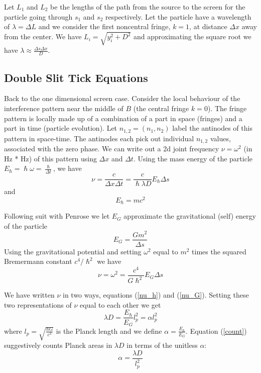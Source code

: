 \documentclass[12pt,a4paper]{article}
\begin{document}
Let $L_1$ and $L_2$ be the lengths of the path from the source to the screen for the particle going through $s_1$ and $s_2$ respectively. Let the particle have a wavelength of $\lambda = \Delta L$ and we consider the first noncentral fringe, $k=1$, at distance $\Delta x$ away from the center.  We have $L_i = \sqrt{y_i^2 + D^2}$ and approximating the square root we have $\lambda \approx \frac{\Delta s \Delta x}{D}$.

\subsection{Double Slit Tick Equations}
Back to the one dimensional screen case.  Consider the local behaviour of the interference pattern near the middle of $B$ (the central fringe $k=0$). The fringe pattern is locally made up of a combination of a part in space (fringes) and a part in time (particle evolution). Let $n_{1,2} = (n_1, n_2)$ label the antinodes of this pattern in space-time. The antinodes each pick out individual $n_{1,2}$ values, associated with the zero phase. We can write out a 2d joint frequency $\nu = \omega^2$ (in Hz * Hz) of this pattern using $\Delta x$ and $\Delta t$.  Using the mass energy of the particle $E_\hslash = \hslash \omega = \frac{\hslash}{\Delta t}$, we have
\begin{equation}
\label{nu_h}
  \nu = \frac{c}{\Delta x \Delta t} = \frac{c}{\hslash \lambda D} E_\hslash \Delta{s}
\end{equation}
and
\begin{equation}
\label{def_h}
E_\hslash = m c^2
\end{equation}


Following suit with Penrose\cite{penrose} we let $E_G$ approximate the gravitational (self) energy of the particle 
\begin{equation}
\label{def_G}
E_G = \frac{G m^2}{\Delta s}
\end{equation}
Using the gravitational potential and setting $\omega^2$  equal to $m^2$ times the squared Bremermann constant $c^4/\hslash^2$ we have
\begin{equation}
\label{nu_G}
\nu = \omega^2 = \frac{c^4}{G \hslash^2} E_G \Delta s
\end{equation}


We have written $\nu$ in two ways, equations (\ref{nu_h}) and (\ref{nu_G}). Setting these two representations of $\nu$ equal to each other we get
\begin{equation}
\label{count}
\lambda D = \frac{E_\hslash}{E_G} l_p^2 = \alpha l_p^2
\end{equation}
where $l_p = \sqrt{\frac{\hbar G}{c^3}}$ is the Planck length and we define $\alpha = \frac{E_\hslash}{E_G}$. Equation (\ref{count}) suggestively counts Planck areas in $\lambda D$ in terms of the unitless $\alpha$:
\begin{equation}
\label{count2}
   \alpha = \frac{\lambda D}{l_p^2}
\end{equation}
\end{document}

